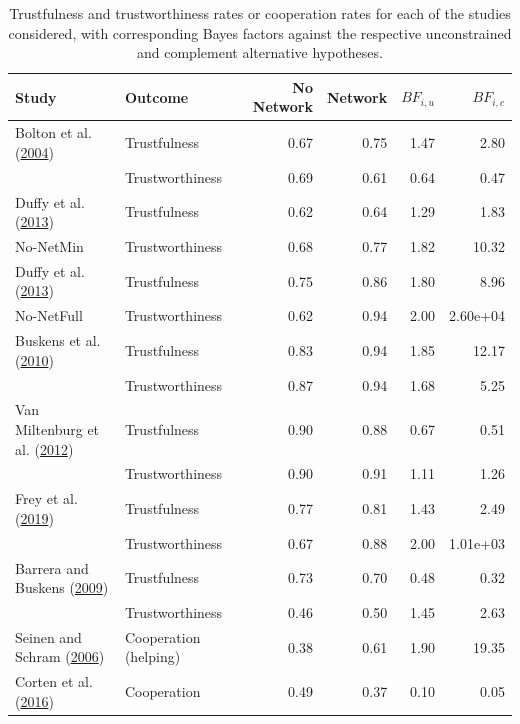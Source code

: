\documentclass[
  11pt,
]{article}
\begin{document}
\renewcommand{\floatpagefraction}{.8}

\begin{table}

\caption{\label{tab:desc-table}Trustfulness and trustworthiness rates or cooperation rates for each of the studies considered, with corresponding Bayes factors against the respective unconstrained and complement alternative hypotheses.}
\centering
\begin{tabular}[t]{llrrrr}
\toprule
Study & Outcome & No Network & Network & $BF_{i,u}$ & $BF_{i,c}$\\
\midrule
Bolton et al. (\protect\hyperlink{ref-bolton_electronic_2004}{2004}) & Trustfulness & 0.67 & 0.75 & 1.47 & 2.80\\
\addlinespace
 & Trustworthiness & 0.69 & 0.61 & 0.64 & 0.47\\
\addlinespace
Duffy et al. (\protect\hyperlink{ref-duffy2013social}{2013}) & Trustfulness & 0.62 & 0.64 & 1.29 & 1.83\\
\addlinespace
No-NetMin & Trustworthiness & 0.68 & 0.77 & 1.82 & 10.32\\
\addlinespace
Duffy et al. (\protect\hyperlink{ref-duffy2013social}{2013}) & Trustfulness & 0.75 & 0.86 & 1.80 & 8.96\\
\addlinespace
No-NetFull & Trustworthiness & 0.62 & 0.94 & 2.00 & 2.60e+04\\
\addlinespace
Buskens et al. (\protect\hyperlink{ref-buskens_raub_veer_triads_2010}{2010}) & Trustfulness & 0.83 & 0.94 & 1.85 & 12.17\\
\addlinespace
 & Trustworthiness & 0.87 & 0.94 & 1.68 & 5.25\\
\addlinespace
Van Miltenburg et al. (\protect\hyperlink{ref-miltenburg_buskens_triads_2012}{2012}) & Trustfulness & 0.90 & 0.88 & 0.67 & 0.51\\
\addlinespace
 & Trustworthiness & 0.90 & 0.91 & 1.11 & 1.26\\
\addlinespace
Frey et al. (\protect\hyperlink{ref-frey_buskens_investments_2019}{2019}) & Trustfulness & 0.77 & 0.81 & 1.43 & 2.49\\
\addlinespace
 & Trustworthiness & 0.67 & 0.88 & 2.00 & 1.01e+03\\
\addlinespace
Barrera and Buskens (\protect\hyperlink{ref-barrera_buskens_third_2009}{2009}) & Trustfulness & 0.73 & 0.70 & 0.48 & 0.32\\
\addlinespace
 & Trustworthiness & 0.46 & 0.50 & 1.45 & 2.63\\
\addlinespace
Seinen and Schram (\protect\hyperlink{ref-seinen_schram_social_2006}{2006}) & Cooperation (helping) & 0.38 & 0.61 & 1.90 & 19.35\\
\addlinespace
Corten et al. (\protect\hyperlink{ref-corten_etal_reputation_2016}{2016}) & Cooperation & 0.49 & 0.37 & 0.10 & 0.05\\
\bottomrule
\end{tabular}
\end{table}
\end{document}
